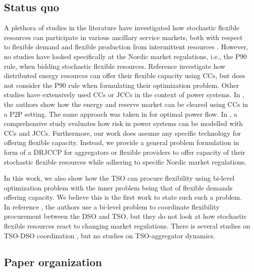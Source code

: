 \documentclass[conference]{IEEEtran}
\begin{document}
\subsection{Status quo}

A plethora of studies in the literature have investigated how stochastic flexible resources can participate in various ancillary service markets, both with respect to flexible demand  \cite{bondy2016procedure, bondy2014performance, biegel2014integration, AchievingControllabilityofElectricLoads} and flexible production from intermittent resources \cite{hansen2016provision, ullah2009wind, morey2023comprehensive, alshehri2019modelling}. However, no studies have looked specifically at the Nordic market regulations, i.e., the P90 rule, when bidding stochastic flexible resources. Reference \cite{zhang2018data} investigate how distributed energy resources can offer their flexible capacity using \acp{CC}, but does not consider the P90 rule when formulating their optimization problem. Other studies have extensively used \acp{CC} or \acp{JCC} in the context of power systems. In \cite{guo2020chance}, the authors show how the energy and reserve market can be cleared using \acp{CC} in a P2P setting. The same approach was taken in \cite{bienstock2014chance} for optimal power flow. In \cite{roald2016optimization}, a comprehensive study evaluates how risk in power systems can be modelled with \acp{CC} and \acp{JCC}. Furthermore, our work does assume any specific technology for offering flexible capacity. Instead, we provide a general problem formulation in form of a \ac{DRJCCP} for aggregators or flexible providers to offer capacity of their stochastic flexible resources while adhering to specific Nordic market regulations.

In this work, we also show how the \ac{TSO} can procure flexibility using bi-level optimization problem with the inner problem being that of flexible demands offering capacity. We believe this is the first work to state such such a problem. In reference \cite{sheikhahmadi2021bi}, the authors use a bi-level problem to coordinate flexibility procurement between the \ac{DSO} and \ac{TSO}, but they do not look at how stochastic flexible resources react to changing market regulations. There is several studies on \ac{TSO}-\ac{DSO} coordination \cite{givisiez2020review, jiang2022flexibility}, but no studies on \ac{TSO}-aggregator dynamics.

\subsection{Paper organization}
\end{document}
